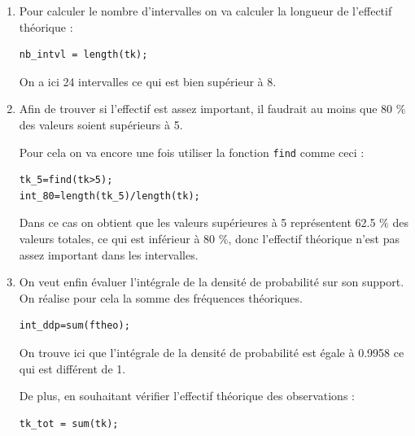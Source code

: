 \documentclass[a4paper,oneside]{article}
\begin{document}
\begin{enumerate}
\begin{center}
\begin{tabular}{|c|c|c|c|}
 \hline
\end{tabular}
 \end{center}

\item

Pour calculer le nombre d'intervalles on va calculer la longueur de l'effectif théorique :

\begin{lstlisting}
nb_intvl = length(tk);
\end{lstlisting}

On a ici 24 intervalles ce qui est bien supérieur à 8.\\


\item

Afin de trouver si l'effectif est assez important, il faudrait au moins que 80 $\%$ des valeurs soient supérieurs à 5.

Pour cela on va encore une fois utiliser la fonction \verb?find? comme ceci : 

\begin{lstlisting}
tk_5=find(tk>5);
int_80=length(tk_5)/length(tk);
\end{lstlisting}

Dans ce cas on obtient que les valeurs supérieures à 5 représentent 62.5 $\%$ des valeurs totales, ce qui est inférieur à 80 $\%$, donc l'effectif théorique n'est pas assez important dans les intervalles.

\newpage

\item
On veut enfin évaluer l'intégrale de la densité de probabilité sur son support. On réalise pour cela la somme des fréquences théoriques.

\begin{lstlisting}
int_ddp=sum(ftheo);

\end{lstlisting}

On trouve ici que l'intégrale de la densité de probabilité est égale à 0.9958 ce qui est différent de 1.

De plus, en souhaitant vérifier l'effectif théorique des observations :

\begin{lstlisting}
tk_tot = sum(tk);

\end{lstlisting}


\end{enumerate}
\end{document}
